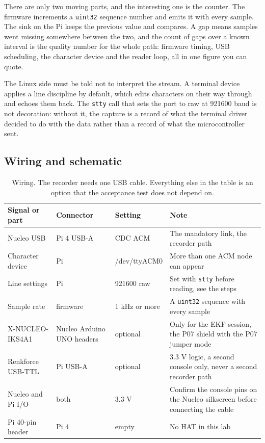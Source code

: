 There are only two moving parts, and the interesting one is the counter. The firmware
increments a \texttt{uint32} sequence number and emits it with every sample. The sink on
the Pi keeps the previous value and compares. A gap means samples went missing somewhere
between the two, and the count of gaps over a known interval is the quality number for the
whole path: firmware timing, USB scheduling, the character device and the reader loop, all
in one figure you can quote.

The Linux side must be told not to interpret the stream. A terminal device applies a line
discipline by default, which edits characters on their way through and echoes them back.
The \texttt{stty} call that sets the port to raw at 921600 baud is not decoration: without
it, the capture is a record of what the terminal driver decided to do with the data rather
than a record of what the microcontroller sent.

\subsection*{Wiring and schematic}


\begin{table}[H]\centering\small
\begin{tabular}{p{38mm}p{28mm}p{24mm}p{58mm}}
\toprule
Signal or part & Connector & Setting & Note \\
\midrule
Nucleo USB & Pi 4 USB-A & CDC ACM & The mandatory link, the recorder path \\
Character device & Pi & /dev/ttyACM0 & More than one ACM node can appear \\
Line settings & Pi & 921600 raw & Set with \texttt{stty} before reading, see the steps \\
Sample rate & firmware & 1 kHz or more & A \texttt{uint32} sequence with every sample \\
X-NUCLEO-IKS4A1 & Nucleo Arduino UNO headers & optional & Only for the EKF session, the P07 shield with the P07 jumper mode \\
Renkforce USB-TTL & Pi USB-A & optional & 3.3 V logic, a second console only, never a second recorder path \\
Nucleo and Pi I/O & both & 3.3 V & Confirm the console pins on the Nucleo silkscreen before connecting the cable \\
Pi 40-pin header & Pi 4 & empty & No HAT in this lab \\
\bottomrule
\end{tabular}
\caption{Wiring. The recorder needs one USB cable. Everything else in the table is an
option that the acceptance test does not depend on.}
\end{table}

